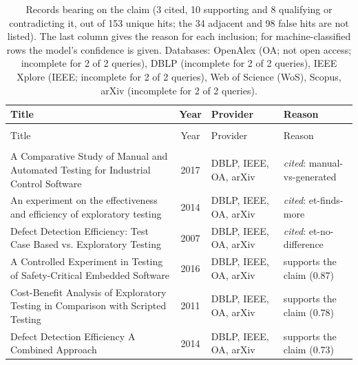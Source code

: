 
\begingroup\footnotesize
\begin{longtable}{@{}%
  >{\raggedright\arraybackslash}p{}c%
  >{\raggedright\arraybackslash}p{}%
  >{\raggedright\arraybackslash}p{}@{}}
\caption{Records bearing on the claim (3 cited, 10 supporting and 8 qualifying or contradicting it, out of 153 unique hits; the 34 adjacent and 98 false hits are not listed). The last column gives the reason for each inclusion; for machine-classified rows the model's confidence is given. Databases: OpenAlex (OA; not open access; incomplete for 2 of 2 queries), DBLP (incomplete for 2 of 2 queries), IEEE Xplore (IEEE; incomplete for 2 of 2 queries), Web of Science (WoS), Scopus, arXiv (incomplete for 2 of 2 queries).}\label{tab:t-exploratory}\\
\toprule
Title & Year & Provider & Reason \\
\midrule
\endfirsthead
\multicolumn{4}{@{}l}{\emph{\tablename~\thetable{} (cont.)}}\\
\toprule
Title & Year & Provider & Reason \\
\midrule
\endhead
\midrule \multicolumn{4}{r@{}}{\emph{continued on next page}}\\
\endfoot
\bottomrule
\endlastfoot
A Comparative Study of Manual and Automated Testing for Industrial Control Software & 2017 & DBLP, IEEE, OA, arXiv & \emph{cited}: manual-vs-generated \\
An experiment on the effectiveness and efficiency of exploratory testing & 2014 & DBLP, IEEE, OA, arXiv & \emph{cited}: et-finds-more \\
Defect Detection Efficiency: Test Case Based vs. Exploratory Testing & 2007 & DBLP, IEEE, OA, arXiv & \emph{cited}: et-no-difference \\
A Controlled Experiment in Testing of Safety-Critical Embedded Software & 2016 & DBLP, IEEE, OA, arXiv & supports the claim (0.87) \\
Cost-Benefit Analysis of Exploratory Testing in Comparison with Scripted Testing & 2011 & DBLP, IEEE, OA, arXiv & supports the claim (0.78) \\
Defect Detection Efficiency A Combined Approach & 2014 & DBLP, IEEE, OA, arXiv & supports the claim (0.73) \\

\end{longtable}
